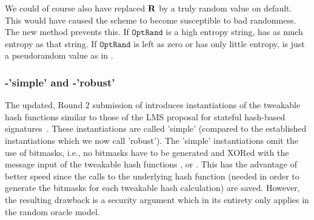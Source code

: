  We could of course also have replaced $\mathbf{R}$ by a truly random value on 
 default. This would have caused the scheme to become susceptible to bad 
 randomness. The new method prevents this. If $\texttt{OptRand}$ is a high 
 entropy string, \Random has as much entropy as that string. If 
 $\texttt{OptRand}$ is left as zero or has only little entropy, \Random 
 is just a pseudorandom value as in \spc.



\subsubsection{\spx-'simple' and \spx-'robust'}

The updated, Round 2 submission of \spx introduces instantiations of the tweakable hash functions similar to those of the LMS proposal for stateful hash-based signatures~\cite{LMSdraft}. These instantiations are called 'simple' (compared to the established instantiations which we now call 'robust'). The 'simple' instantiations omit the use of bitmasks, i.e., no bitmasks have to be generated and XORed with the message input 
of the tweakable hash functions \sphincsF, \sphincsH or \sphincsT. 
This has the advantage of better speed since the calls to 
the underlying hash function (needed in order to generate the bitmasks for each tweakable hash calculation) are saved. However, the resulting drawback is a security argument which in its entirety only applies in the random oracle model. 


